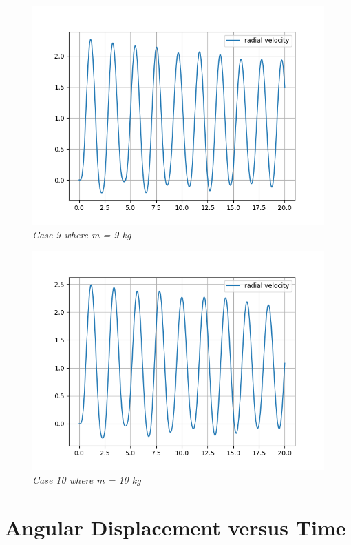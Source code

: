         \begin{figure}[H]
            \centering
            \includegraphics{Appendix/RSimPictures/R/rm9.png}
            \caption{\textit{Case 9 where m = 9 kg}}
            \label{}
        \end{figure}
            
        \begin{figure}[H]
            \centering
            \includegraphics{Appendix/RSimPictures/R/rm10.png}
            \caption{\textit{Case 10 where m = 10 kg}}
            \label{}
        \end{figure}
            
    \section{{Angular Displacement versus Time}}
            
